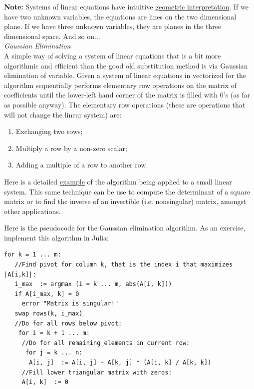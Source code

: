 \documentclass[11pt,a4paper,oneside]{report}
\begin{document}
{\bf Note: }Systems of linear equations have intuitive \href{https://en.wikipedia.org/wiki/System_of_linear_equations#Geometric_interpretation}{geometric interpretation}. If we have two unknown variables, the equations are lines on the two dimensional plane. If we have three unknown variables, they are planes in the three dimensional space. And so on...\\

{\it\Large\color{red} Gaussian Elimination}\\

A simple way of solving a system of linear equations that is a bit more algorithmic and efficient than the good old substitution method is via Gaussian elimination of variable. Given a system of linear equations in vectorized for the algorithm sequentially performs elementary row operations on the matrix of coefficients until the lower-left hand corner of the matrix is filled with 0's (as far as possible anyway). The elementary row operations (these are operations that will not change the linear system) are:

\begin{enumerate}
\setlength{\itemsep}{0pt}
\item Exchanging two rows;
\item Multiply a row by a non-zero scalar;
\item Adding a multiple of a row to another row.
\end{enumerate}

Here is a detailed \href{https://en.wikipedia.org/wiki/Gaussian_elimination#Example_of_the_algorithm}{example} of the algorithm being applied to a small linear system. This same technique can be use to compute the determinant of a square matrix or to find the inverse of an invertible (i.e. nonsingular) matrix, amongst other applications.

Here is the pseudocode for the Gaussian elimination algorithm. As an exercise, implement this algorithm in Julia:
\begin{verbatim}
for k = 1 ... m:
   //Find pivot for column k, that is the index i that maximizes |A[i,k]|:
   i_max  := argmax (i = k ... m, abs(A[i, k]))
   if A[i_max, k] = 0
     error "Matrix is singular!"
   swap rows(k, i_max)
   //Do for all rows below pivot:
    for i = k + 1 ... m:
     //Do for all remaining elements in current row:
      for j = k ... n:
       A[i, j]  := A[i, j] - A[k, j] * (A[i, k] / A[k, k])
     //Fill lower triangular matrix with zeros:
     A[i, k]  := 0
\end{verbatim}
\end{document}
